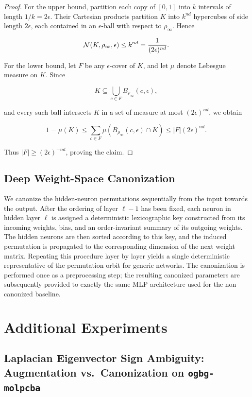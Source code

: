 \documentclass{article}
\begin{document}
\begin{proof}
For the upper bound, partition each copy of $[0,1]$ into $k$ intervals of length $1/k=2\epsilon$. Their Cartesian products partition $K$ into $k^{nd}$ hypercubes of side length $2\epsilon$, each contained in an $\epsilon$-ball with respect to $\rho_\infty$. Hence

$$
\mathcal{N}(K,\rho_\infty,\epsilon)\leq k^{nd}=\frac{1}{(2\epsilon)^{nd}}.
$$

For the lower bound, let $F$ be any $\epsilon$-cover of $K$, and let $\mu$ denote Lebesgue measure on $K$. Since

$$
K\subseteq\bigcup_{c\in F}B_{\rho_\infty}(c,\epsilon),
$$

and every such ball intersects $K$ in a set of measure at most $(2\epsilon)^{nd}$, we obtain

$$
1=\mu(K)\leq\sum_{c\in F}\mu(B_{\rho_\infty}(c,\epsilon)\cap K)
\leq |F|(2\epsilon)^{nd}.
$$

Thus $|F|\geq(2\epsilon)^{-nd}$, proving the claim.
\end{proof}

\subsection{Deep Weight-Space Canonization}
\label{app:dws_canonization}

We canonize the hidden-neuron permutations sequentially from the input
towards the output. After the ordering of layer $\ell-1$ has been fixed,
each neuron in hidden layer $\ell$ is assigned a deterministic
lexicographic key constructed from its incoming weights, bias, and an
order-invariant summary of its outgoing weights. The hidden neurons are
then sorted according to this key, and the induced permutation is
propagated to the corresponding dimension of the next weight matrix.
Repeating this procedure layer by layer yields a single deterministic
representative of the permutation orbit for generic networks. The
canonization is performed once as a preprocessing step; the resulting
canonized parameters are subsequently provided to exactly the same MLP
architecture used for the non-canonized baseline.

\section{Additional Experiments}
\label{sec:add_exp}


\subsection{Laplacian Eigenvector Sign Ambiguity: Augmentation vs.\ Canonization on \texttt{ogbg-molpcba}}
\label{subsec:lpe_molpcba}
\end{document}
